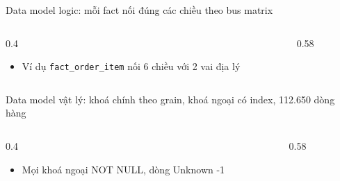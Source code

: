 \begin{frame}{Data model logic: mỗi fact nối đúng các chiều theo bus matrix}
\begin{columns}[T]\begin{column}{0.4\textwidth}
\begin{itemize}
  \item Ví dụ \texttt{fact\_\allowbreak{}order\_\allowbreak{}item} nối 6 chiều với 2 vai địa lý
\end{itemize}
\end{column}\begin{column}{0.58\textwidth}
\begin{center}\end{center}
\end{column}\end{columns}

\end{frame}

\begin{frame}{Data model vật lý: khoá chính theo grain, khoá ngoại có index, 112.650 dòng hàng}
\begin{columns}[T]\begin{column}{0.4\textwidth}
\begin{itemize}
  \item Mọi khoá ngoại NOT NULL, dòng Unknown -1
\end{itemize}
\end{column}\begin{column}{0.58\textwidth}
\begin{center}\end{center}
\end{column}\end{columns}

\end{frame}

